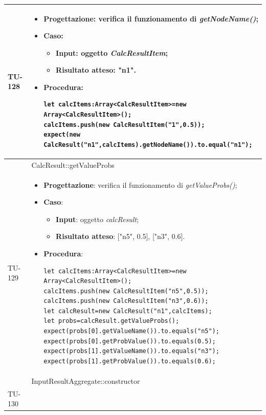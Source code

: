 \begin{longtable}{|C{1.5cm}|C{14.5cm}|}
\\ \hline
{TU-128} &
\begin{itemize}
	\item \textbf{Progettazione}: verifica il funzionamento di \emph{getNodeName()};
	\item \textbf{Caso}: 
	\begin{itemize}
		\item \textbf{Input}: oggetto \emph{CalcResultItem};
		\item \textbf{Risultato atteso}: "n1".
	\end{itemize}
	\item \textbf{Procedura}:
	\begin{lstlisting}
let calcItems:Array<CalcResultItem>=new Array<CalcResultItem>();
calcItems.push(new CalcResultItem("1",0.5));
expect(new CalcResult("n1",calcItems).getNodeName()).to.equal("n1");
	\end{lstlisting}
\end{itemize}\\
\hline
{} & CalcResult::getValueProbs
\\ \hline
{TU-129} &
\begin{itemize}
	\item \textbf{Progettazione}: verifica il funzionamento di \emph{getValueProbs()};
	\item \textbf{Caso}: 
	\begin{itemize}
		\item \textbf{Input}: oggetto \emph{calcResult};
		\item \textbf{Risultato atteso}: ["n5", 0.5], ["n3", 0.6].
	\end{itemize}
	\item \textbf{Procedura}:
	\begin{lstlisting}
let calcItems:Array<CalcResultItem>=new Array<CalcResultItem>();
calcItems.push(new CalcResultItem("n5",0.5));
calcItems.push(new CalcResultItem("n3",0.6));
let calcResult=new CalcResult("n1",calcItems);
let probs=calcResult.getValueProbs();
expect(probs[0].getValueName()).to.equals("n5");
expect(probs[0].getProbValue()).to.equals(0.5);
expect(probs[1].getValueName()).to.equals("n3");
expect(probs[1].getProbValue()).to.equals(0.6);
	\end{lstlisting}
\end{itemize}\\
\hline
{} & InputResultAggregate::constructor
\\ \hline
{TU-130} &
\begin{itemize}

\end{itemize}
\end{longtable}
